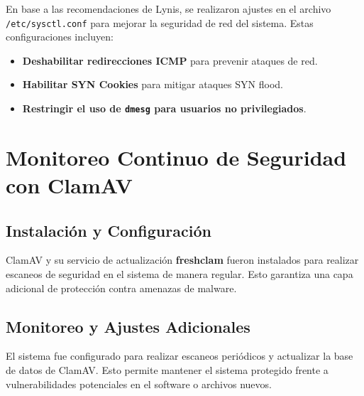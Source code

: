En base a las recomendaciones de Lynis, se realizaron ajustes en el archivo \texttt{/etc/sysctl.conf} para mejorar la seguridad de red del sistema. Estas configuraciones incluyen:

\begin{itemize}
    \item \textbf{Deshabilitar redirecciones ICMP} para prevenir ataques de red.
    \item \textbf{Habilitar SYN Cookies} para mitigar ataques SYN flood.
    \item \textbf{Restringir el uso de \texttt{dmesg} para usuarios no privilegiados}.
\end{itemize}

\section{Monitoreo Continuo de Seguridad con ClamAV}

\subsection{Instalación y Configuración}
ClamAV y su servicio de actualización \textbf{freshclam} fueron instalados para realizar escaneos de seguridad en el sistema de manera regular. Esto garantiza una capa adicional de protección contra amenazas de malware.

\subsection{Monitoreo y Ajustes Adicionales}
El sistema fue configurado para realizar escaneos periódicos y actualizar la base de datos de ClamAV. Esto permite mantener el sistema protegido frente a vulnerabilidades potenciales en el software o archivos nuevos.
















